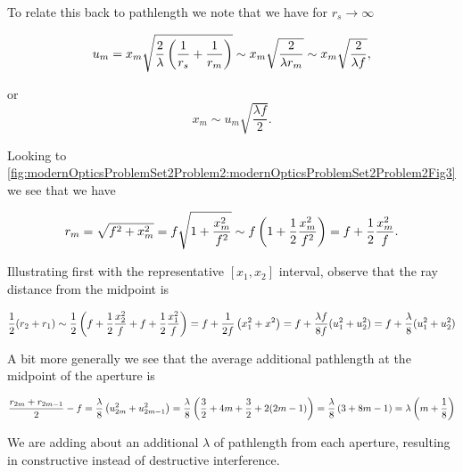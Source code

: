 {To relate this back to pathlength we note that we have for $r_s \rightarrow \infty$

\begin{dmath}\label{eqn:modernOptics:ProblemSet2:P2:240}
u_m 
= x_m \sqrt{ \frac{2}{\lambda} \left( \inv{r_s} + \inv{r_m} \right) }
\sim 
x_m \sqrt{ \frac{2}{\lambda r_m} }
\sim 
x_m \sqrt{ \frac{2}{\lambda f} },
\end{dmath}

or
\begin{equation}\label{eqn:modernOptics:ProblemSet2:P2:260}
x_m \sim u_m \sqrt{ \frac{\lambda f}{2} }.
\end{equation}

Looking to \cref{fig:modernOpticsProblemSet2Problem2:modernOpticsProblemSet2Problem2Fig3} we see that we have


\begin{dmath}\label{eqn:modernOptics:ProblemSet2:P2:280}
r_m 
= \sqrt{f^2 + x_m^2} 
= f \sqrt{ 1 + \frac{x_m^2}{f^2} }
\sim f \left( 1 + \inv{2} \frac{x_m^2}{f^2} \right)
= f + \inv{2} \frac{x_m^2}{f}.
\end{dmath}

Illustrating first with the representative $[x_1, x_2]$ interval, observe that the ray distance from the midpoint is

\begin{dmath}\label{eqn:modernOptics:ProblemSet2:P2:300}
\inv{2} (r_2 + r_1) \sim 
\inv{2} \left( 
f + \inv{2} \frac{x_2^2}{f} 
+f + \inv{2} \frac{x_1^2}{f} 
\right)
=
f + \inv{2 f} \left( x_1^2 + x^2 \right)
=
f + \frac{\lambda f}{8 f} ( u_1^2 + u_2^2 )
=
f + \frac{\lambda}{8} ( u_1^2 + u_2^2 )
\end{dmath}

A bit more generally we see that the average additional pathlength at the midpoint of the aperture is 

\begin{dmath}\label{eqn:modernOptics:ProblemSet2:P2:320}
\frac{r_{2m} + r_{2m-1}}{2} - f 
= \frac{\lambda}{8} \left( u_{2m}^2 + u_{2m-1}^2 \right)
= \frac{\lambda}{8} \left( \frac{3}{2} + 4 m + \frac{3}{2} + 2 (2m -1) \right)
= \frac{\lambda}{8} \left( 3 + 8 m - 1 \right)
= \lambda \left( m + \inv{8} \right)
\end{dmath}

We are adding about an additional $\lambda$ of pathlength from each aperture, resulting in constructive instead of destructive interference.

}
